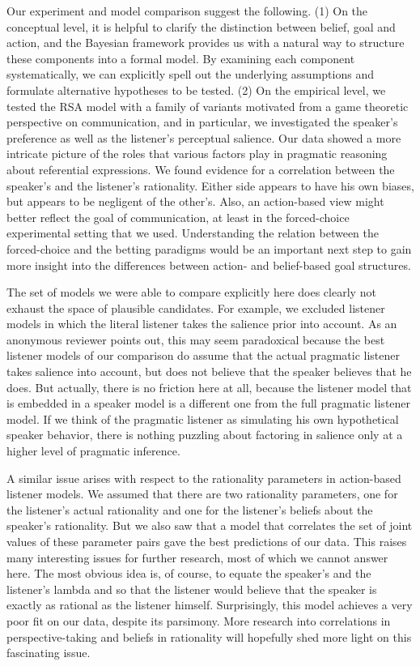 Our experiment and model comparison suggest the following. (1) On the
conceptual level, it is helpful to clarify the distinction between
belief, goal and action, and the Bayesian framework provides us with a
natural way to structure these components into a formal model. By
examining each component systematically, we can explicitly spell out
the underlying assumptions and formulate alternative hypotheses to be
tested. (2) On the empirical level, we tested the RSA model with a
family of variants motivated from a game theoretic perspective on
communication, and in particular, we investigated the speaker's
preference as well as the listener's perceptual salience. Our data
showed a more intricate picture of the roles that various factors play
in pragmatic reasoning about referential expressions. We found
evidence for a correlation between the speaker's and the listener's
rationality. Either side appears to have his own biases, but appears
to be negligent of the other's. Also, an action-based view might
better reflect the goal of communication, at least in the
forced-choice experimental setting that we used. Understanding the
relation between the forced-choice and the betting paradigms would be
an important next step to gain more insight into the differences
between action- and belief-based goal structures.

The set of models we were able to compare explicitly here does clearly
not exhaust the space of plausible candidates. For example, we
excluded listener models in which the literal listener takes the
salience prior into account. As an anonymous reviewer points out, this
may seem paradoxical because the best listener models of our
comparison do assume that the actual pragmatic listener takes salience
into account, but does not believe that the speaker believes that he
does. But actually, there is no friction here at all, because the
listener model that is embedded in a speaker model is a different one
from the full pragmatic listener model. If we think of the pragmatic
listener as simulating his own hypothetical speaker behavior, there is
nothing puzzling about factoring in salience only at a higher level of
pragmatic inference.

A similar issue arises with respect to the rationality parameters in
action-based listener models. We assumed that there are two
rationality parameters, one for the listener's actual rationality and
one for the listener's beliefs about the speaker's rationality. But we
also saw that a model that correlates the set of joint values of these
parameter pairs gave the best predictions of our data. This raises
many interesting issues for further research, most of which we cannot
answer here. The most obvious idea is, of course, to equate the
speaker's and the listener's lambda and so that the listener would
believe that the speaker is exactly as rational as the listener
himself. Surprisingly, this model achieves a very poor fit on our
data, despite its parsimony. More research into correlations in
perspective-taking and beliefs in rationality will hopefully shed more
light on this fascinating issue.


